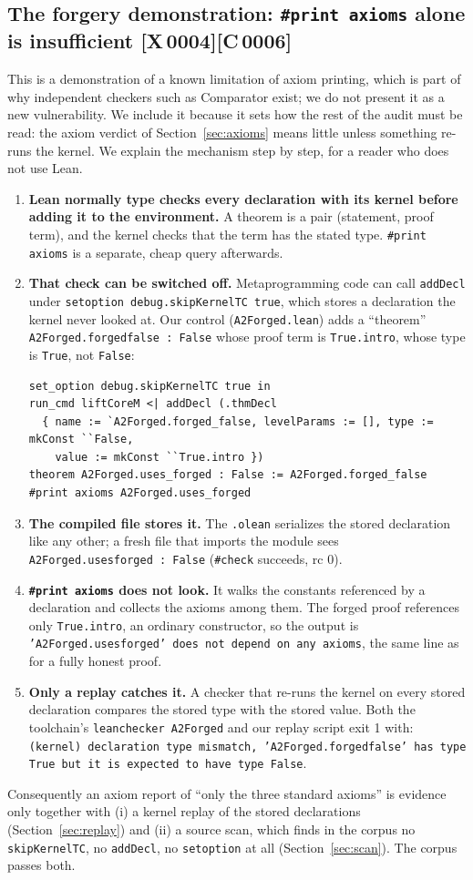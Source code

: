 \documentclass[10pt]{article}
\newcommand{\tg}[2]{\texorpdfstring{\textsf{[#1\,#2]}}{}}  %
\newcommand{\lean}[1]{\texttt{#1}}
\renewcommand{\_}{\textunderscore\allowbreak}
\begin{document}
\subsection{The forgery demonstration: \lean{\#print axioms} alone is insufficient \tg{X}{0004}\tg{C}{0006}}\label{sec:forge}
This is a demonstration of a known limitation of axiom printing, which is part of why independent checkers such as Comparator exist; we do not present it as a new vulnerability. We include it because it sets how the rest of the audit must be read: the axiom verdict of Section~\ref{sec:axioms}
means little unless something re-runs the kernel. We explain the mechanism step by step, for a reader who does not use Lean.
\begin{enumerate}[leftmargin=*]
\item \textbf{Lean normally type checks every declaration with its kernel before adding it to the environment.} A theorem is a pair (statement, proof term), and the kernel checks that the term has the stated type. \lean{\#print axioms} is a separate, cheap query afterwards.
\item \textbf{That check can be switched off.} Metaprogramming code can call \lean{addDecl} under \lean{set\_option debug.skipKernelTC true}, which stores a declaration the kernel never looked at. Our control (\texttt{A2Forged.lean}) adds a ``theorem'' \lean{A2Forged.forged\_false : False} whose proof term is \lean{True.intro}, whose type is \lean{True}, not \lean{False}:
\begin{lstlisting}
set_option debug.skipKernelTC true in
run_cmd liftCoreM <| addDecl (.thmDecl
  { name := `A2Forged.forged_false, levelParams := [], type := mkConst ``False,
    value := mkConst ``True.intro })
theorem A2Forged.uses_forged : False := A2Forged.forged_false
#print axioms A2Forged.uses_forged
\end{lstlisting}
\item \textbf{The compiled file stores it.} The \texttt{.olean} serializes the stored declaration like any other; a fresh file that imports the module sees \lean{A2Forged.uses\_forged : False} (\lean{\#check} succeeds, rc 0).
\item \textbf{\lean{\#print axioms} does not look.} It walks the constants referenced by a declaration and collects the axioms among them. The forged proof references only \lean{True.intro}, an ordinary constructor, so the output is
\lean{'A2Forged.uses\_forged' does not depend on any axioms}, the same line as for a fully honest proof.
\item \textbf{Only a replay catches it.} A checker that re-runs the kernel on every stored declaration compares the stored type with the stored value. Both the toolchain's \texttt{leanchecker A2Forged} and our replay script exit 1 with:
\lean{(kernel) declaration type mismatch, 'A2Forged.forged\_false' has type True but it is expected to have type False}.
\end{enumerate}
Consequently an axiom report of ``only the three standard axioms'' is evidence only together with (i) a kernel replay of the stored declarations (Section~\ref{sec:replay}) and (ii) a source scan, which finds in the corpus no \lean{skipKernelTC}, no \lean{addDecl}, no \lean{set\_option} at all (Section~\ref{sec:scan}). The corpus passes both.
\end{document}
